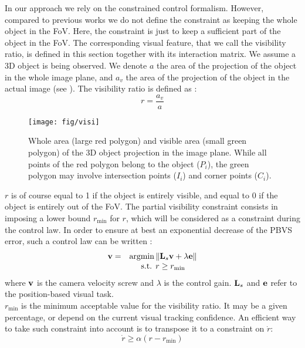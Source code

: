 \documentclass[letterpaper, 10 pt, conference]{IEEEtran}  %
\begin{document}
In our approach we rely on the constrained control formalism. However, compared to previous works \cite{Kermorgant11b} we do not define the constraint as keeping the whole object in the FoV. Here, the constraint is just to keep a sufficient part of the object in the FoV.
The corresponding visual feature, that we call the visibility ratio, is defined in this section together with its interaction matrix.
We assume a 3D object is being observed. We denote $a$ the area of the projection of the object in the whole image plane, and $a_v$ the area of the projection of the object in the actual image (see ). The visibility ratio is defined as :
\begin{equation}\label{def:ratio}
r = \frac{a_v}{a}
\end{equation}
\begin{figure}\centering
\texttt{[image: fig/visi]}
\caption{Whole area (large red polygon) and visible area (small green polygon) of the 3D object projection in the image plane.
While all points of the red polygon belong to the object ($P_i$), the green polygon may involve intersection points ($I_i$) and corner points ($C_i$). }
\label{fig:poly}
\end{figure}
$r$ is of course equal to 1 if the object is entirely visible, and equal to 0 if the object is entirely out of the FoV.
The partial visibility constraint consists in imposing a lower bound $r_{\text{min}}$ for $r$, which will be considered as a constraint during the control law.
In order to ensure at best an exponential decrease of the PBVS error, such a control law can be written \cite{kanoun2010kinematic}:
\begin{equation}\label{def:law}
\begin{array}{lc} \v = & \argmin \norm{\L_s\v + \lambda\e} \\
								& \text{s.t.  }  r \geq r_{\text{min}}
								\end{array}
\end{equation}where $\mathbf{v}$ is the camera velocity screw and $\lambda$ is the control gain. $\mathbf{L}_s$ and $\mathbf{e}$ refer to the position-based visual task.\\
$r_{\text{min}}$ is the minimum acceptable value for the visibility ratio. It may be a given percentage, or depend on the current visual tracking confidence.
An efficient way to take such  constraint into account is to transpose it to a constraint on $\dot r$:
\begin{equation}\label{def:kincont}
\dot r \geq \alpha(r-r_{\text{min}})
\end{equation}
\end{document}
